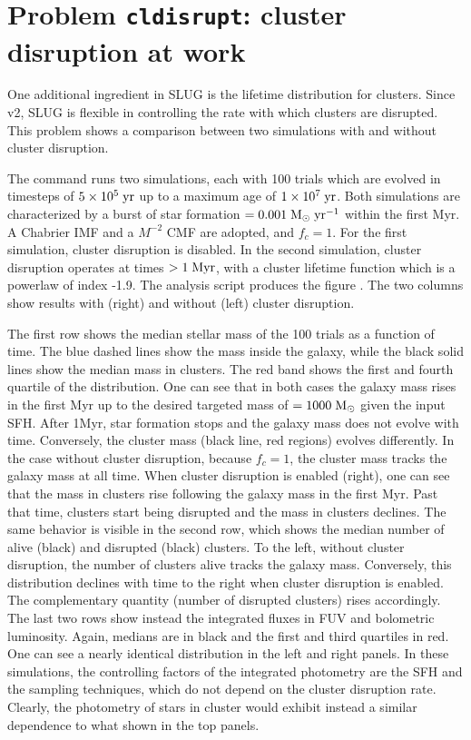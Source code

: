 \documentclass[letterpaper,10pt,english]{sphinxmanual}
\begin{document}
\section{Problem \texttt{cldisrupt}: cluster disruption at work}
\label{tests:problem-cldisrupt-cluster-disruption-at-work}
One additional ingredient in SLUG is the lifetime distribution for clusters. Since v2, SLUG is flexible in
controlling the rate with which clusters are disrupted. This problem shows a comparison between
two simulations with and without cluster disruption.

The command   runs two  simulations, each with 100 trials
which are evolved in timesteps of  \(5\times 10^5\rm\;yr\) up to a maximum age of
\(1\times 10^7\rm\;yr\). Both simulations are characterized by a burst of star formation
\(=0.001\rm\;M_\odot\;yr^{-1}\) within the first Myr. A Chabrier IMF and a \(M^{-2}\)
CMF are adopted, and \(f_c = 1\). For the first simulation, cluster disruption is
disabled. In the second simulation, cluster disruption operates at times \(>1\rm\;Myr\),
with a cluster lifetime function which is a powerlaw of index -1.9.
The analysis script  produces the figure .
The two columns show results with (right) and without (left) cluster disruption.

The first row shows the median stellar mass of the 100 trials as a function of time.
The blue dashed lines show the mass inside the galaxy, while the black solid lines show the
median mass in clusters. The red band shows the first and fourth quartile of the distribution.
One can see that in both cases the galaxy mass rises in the first Myr up to the desired
targeted mass of \(=1000\rm\;M_\odot\) given the input SFH. After 1Myr, star formation
stops and the galaxy mass does not evolve with time. Conversely, the cluster mass (black line, red
regions) evolves differently. In the case without cluster disruption, because \(f_c = 1\),
the cluster mass tracks the galaxy mass at all time. When cluster disruption is enabled (right),
one can see that the mass in clusters rise following the galaxy mass in the first Myr. Past that time,
clusters start being disrupted and the mass in clusters declines.
The same behavior is visible in the second row, which shows the median number of alive (black) and
disrupted (black) clusters. To the left, without cluster disruption, the number of clusters alive
tracks the galaxy mass. Conversely, this distribution declines with time to the right when cluster disruption is
enabled. The complementary quantity (number of disrupted clusters) rises accordingly.
The last two rows show instead the integrated fluxes in FUV and bolometric luminosity.
Again, medians are in black and the first and third quartiles in red. One can see a nearly identical distribution
in the left and right panels. In these simulations, the controlling factors of the integrated photometry
are the SFH and the sampling techniques, which do not depend on the cluster disruption rate. Clearly, the
photometry of stars in cluster would exhibit instead a similar dependence to what shown in the top panels.
\end{document}

